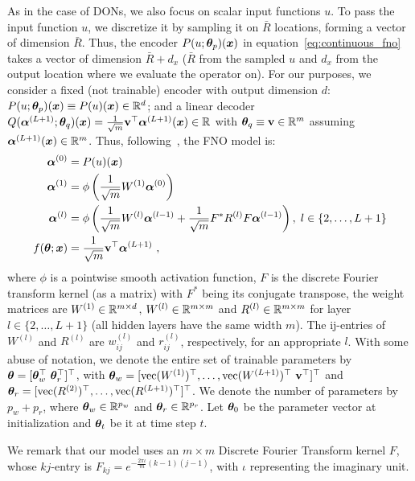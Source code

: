 As in the case of DONs, we also focus on scalar input functions $u$. 
To pass the 
input function $u$,
we discretize it by sampling it 
on $\bar{R}$ locations, 
forming a vector of dimension $\bar{R}$.
Thus,
the encoder $P(u;{\bm{\theta}}_p)(\boldsymbol{x})$ in equation~\eqref{eq:continuous_fno} takes a vector of dimension $\bar{R}+d_x$ ($\bar{R}$ from the sampled $u$ and $d_x$ from the output location where we evaluate the operator on). For our purposes, we consider a fixed (not trainable) encoder with output dimension $d$: $P(u;{\bm{\theta}}_p)(\boldsymbol{x})\equiv P(u)(\boldsymbol{x})\in{\mathbb{R}}^d$; and a linear decoder $Q(\boldsymbol{\alpha}^{({L+1})};{\bm{\theta}}_q)({\bm{x}})=\frac{1}{\sqrt{m}}\mathbf{v}^\top \boldsymbol{\alpha}^{({L+1})}({\bm{x}})\in{\mathbb{R}}$ with ${\bm{\theta}}_q\equiv \mathbf{v}\in{\mathbb{R}}^m$ assuming $\boldsymbol{\alpha}^{(L+1)}(\boldsymbol{x})\in{\mathbb{R}}^m$. 
Thus, following~\citep{li_fourier_2021}, the FNO model is:
\begin{align*}
\boldsymbol{\alpha}^{(0)} &= P(u)(\boldsymbol{x})\\
\boldsymbol{\alpha}^{(1)} &= \phi\left(
        \frac{1}{\sqrt{m}} W^{(1)} \boldsymbol{\alpha}^{(0)}
    \right)\\
\boldsymbol{\alpha}^{(l)} & = \phi\left(
        \frac{1}{\sqrt{m}} W^{(l)} \boldsymbol{\alpha}^{(l-1)} +
        \frac{1}{\sqrt{m}} F^{*} R^{(l)} F \boldsymbol{\alpha}^{(l-1)}
    \right),\; l\in \{2,\dots,L+1\}\\
    f({\bm{\theta}};{\bm{x}})  &= \frac{1}{\sqrt{m}} \mathbf{v}^\top \boldsymbol{\alpha}^{(L+1)}~,
\end{align*}
where $\phi$ is a pointwise smooth activation function, $F$ is the discrete Fourier transform kernel (as a matrix) with $F^*$ being its conjugate transpose, 
the weight matrices are $W^{(1)}\in{\mathbb{R}}^{m\times d}$, $W^{(l)}\in{\mathbb{R}}^{m\times m}$ and $R^{(l)}\in{\mathbb{R}}^{m\times m}$ for layer $l\in\{2,\dots, L+1\}$ (all hidden layers have the same width $m$). The ij-entries of $W^{(l)}$ and $R^{(l)}$ are $w^{(l)}_{ij}$ and $r^{(l)}_{ij}$, respectively, for an appropriate $l$. With some abuse of notation, we denote the entire set of trainable parameters by $\vtheta = [\vtheta_w^{\top}\ \vtheta_r^{\top}]^{\top}$, with $\vtheta_w = [\text{vec}(W^{(1)})^{\top},\dots,\text{vec}(W^{(L+1)})^{\top}\ \mathbf{v}^{\top}]^{\top}$ and ${\bm{\theta}}_r = [\text{vec}(R^{(2)})^\top,\dots,\text{vec}(R^{(L+1)})^{\top}]^{\top}$. We denote the number of parameters by $p_w + p_r$, where ${\bm{\theta}}_w\in{\mathbb{R}}^{p_w}$ and ${\bm{\theta}}_r\in{\mathbb{R}}^{p_r}$.  
%
%
Let ${\bm{\theta}}_0$ be the parameter vector at initialization and ${\bm{\theta}}_t$ be it at time step $t$.

We remark that our model uses an $m\times m$ Discrete Fourier Transform %
kernel $F$, whose $kj$-entry is $F_{kj}=e^{-\frac{2\pi \iota}{m}(k-1)(j-1)}$, with $\iota$ representing the imaginary unit.

